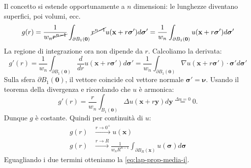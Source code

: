 \documentclass[10pt,a4paper,twoside,openright]{book}
\newcommand{\x}{\mathbf{x}}
\newcommand{\y}{\mathbf{y}}
\begin{document}
\begin{dimostrazione}
\begin{figure}[H]
	\end{figure}
	\FloatBarrier

	Il concetto si estende opportunamente a $\displaystyle n$ dimensioni: le lunghezze diventano superfici, poi volumi, ecc.
	\begin{equation*}
	g( r) =\frac{1}{w_{n}\cancel{r^{n-1}}}\int _{\partial B_{1}(\mathbf{0})}\cancel{r^{n-1}} u(\x +r\bm{\sigma } ') d\bm{\sigma } '=\frac{1}{w_{n}}\int _{\partial B_{1}(\mathbf{0})} u(\x +r\bm{\sigma } ') d\bm{\sigma } '
	\end{equation*}
	La regione di integrazione ora non dipende da $\displaystyle r$. Calcoliamo la derivata:
	\begin{equation*}
	g'( r) =\frac{1}{w_{n}}\int _{\partial B_{1}(\mathbf{0})}\frac{d}{dr} u(\x +r\bm{\sigma } ') d\bm{\sigma } '=\frac{1}{w_{n}}\int _{\partial B_{1}(\mathbf{0})} \nabla u(\x +r\bm{\sigma } ') \cdotp \bm{\sigma } 'd\bm{\sigma } '
	\end{equation*}
	Sulla sfera $\displaystyle \partial B_{1}(\mathbf{0})$, il vettore coincide col vettore normale $\displaystyle \bm{\sigma } '=\mathbf{\nu }$. Usando il teorema della divergenza e ricordando che $\displaystyle u$ è armonica:
	\begin{equation*}
	g'( r) =\frac{r}{w_{n}}\int _{B_{1}(\mathbf{0})} \Delta u(\x +r\y) d\y\overset{\Delta u=0}{=} 0.
	\end{equation*}
	Dunque $\displaystyle g$ è costante. Quindi per continuità di $\displaystyle u$:
	\begin{align*}
		g( r) & \xrightarrow{r\rightarrow 0^{+}} u(\x)\\
		g( r) & \xrightarrow{r\rightarrow R}\frac{1}{w_{n} R^{n-1}}\int _{\partial B_{R}(\x)} u(\bm{\sigma }) d\bm{\sigma }
	\end{align*}
	Eguagliando i due termini otteniamo la \eqref{eq:lap-prop-media-i}.
	

\end{dimostrazione}
\end{document}
